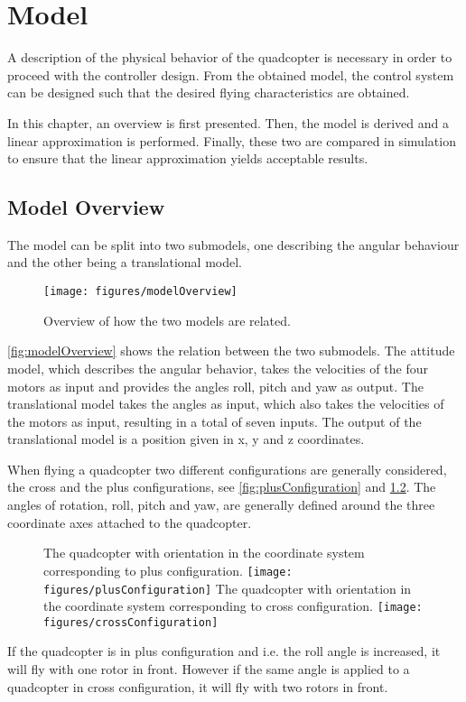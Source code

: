 \chapter{Model}\label{chap:Model}
A description of the physical behavior of the quadcopter is necessary in order to proceed with the controller design. From the obtained model, the control system can be designed such that the desired flying characteristics are obtained.

In this chapter, an overview is first presented. Then, the model is derived and a linear approximation is performed. Finally, these two are compared in simulation to ensure that the linear approximation yields acceptable results.

\section{Model Overview} \label{sec:ModelOverview}
The model can be split into two submodels, one describing the angular behaviour and the other being a translational model.
\begin{figure}[H]
    \centering
    \texttt{[image: figures/modelOverview]}
    \caption{Overview of how the two models are related.}
    \label{fig:modelOverview}
\end{figure}
%
\autoref{fig:modelOverview} shows the relation between the two submodels. The attitude model, which describes the angular behavior, takes the velocities of the four motors as input and provides the angles roll, pitch and yaw as output. The translational model takes the angles as input, which also takes the velocities of the motors as input, resulting in a total of seven inputs. The output of the translational model is a position given in x, y and z coordinates.

When flying a quadcopter two different configurations are generally considered, the cross and the plus configurations, see \autoref{fig:plusConfiguration} and \ref{fig:crossConfiguration}. The angles of rotation, roll, pitch and yaw, are generally defined around the three coordinate axes attached to the quadcopter. \cite{HLChan}
%
\begin{figure}[H]
  \centering
  \captionbox
  {
    The quadcopter with orientation in the coordinate system corresponding to plus configuration.
    \label{fig:plusConfiguration}
  }
  {
    \texttt{[image: figures/plusConfiguration]}
  }
  \hspace{5pt}
  \captionbox
  {
    The quadcopter with orientation in the coordinate system corresponding to cross configuration.
    \label{fig:crossConfiguration}
  }
  {
    \texttt{[image: figures/crossConfiguration]}
  }
\end{figure}
%
If the quadcopter is in plus configuration and i.e. the roll angle is increased, it will fly with one rotor in front. However if the same angle is applied to a quadcopter in cross configuration, it will fly with two rotors in front. \cite{HLChan}

